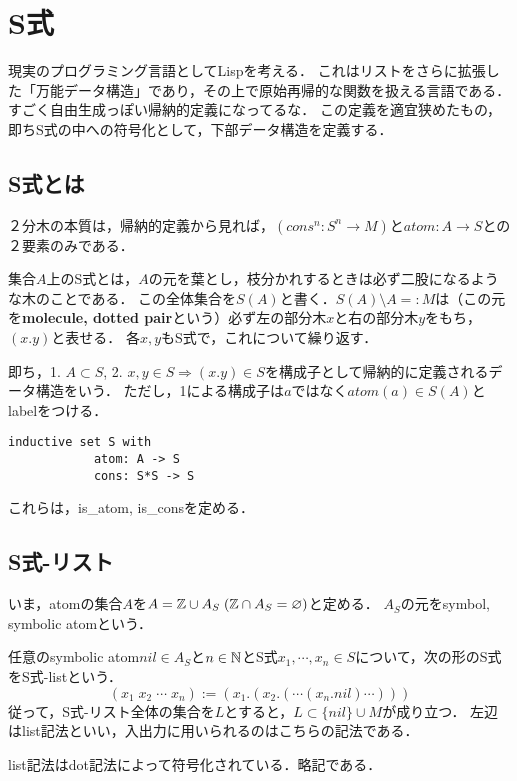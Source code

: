 \documentclass[uplatex, 12pt, dvipdfmx]{jsreport}
\begin{document}
\section{S式}

現実のプログラミング言語としてLispを考える．
これはリストをさらに拡張した「万能データ構造」であり，その上で原始再帰的な関数を扱える言語である．
すごく自由生成っぽい帰納的定義になってるな．
この定義を適宜狭めたもの，即ちS式の中への符号化として，下部データ構造を定義する．

\subsection{S式とは}

２分木の本質は，帰納的定義から見れば，$(cons^n:S^n\to M)$と$atom:A\to S$との２要素のみである．

\begin{definition}
    集合$A$上のS式とは，$A$の元を葉とし，枝分かれするときは必ず二股になるような木のことである．
    この全体集合を$S(A)$と書く．$S(A)\setminus A=:M$は（この元を\textbf{molecule, dotted pair}という）必ず左の部分木$x$と右の部分木$y$をもち，$(x.y)$と表せる．
    各$x,y$もS式で，これについて繰り返す．
\end{definition}
\begin{remark}
    即ち，1. $A\subset S$, 2. $x,y\in S\Rightarrow (x.y)\in S$を構成子として帰納的に定義されるデータ構造をいう．
    ただし，1による構成子は$a$ではなく$atom(a)\in S(A)$とlabelをつける．
    \begin{lstlisting}[caption=inductive definition of S-formula]
        inductive set S with
            atom: A -> S
            cons: S*S -> S
    \end{lstlisting}
    これらは，is\_atom, is\_consを定める．
\end{remark}

\subsection{S式-リスト}

\begin{definition}
    いま，atomの集合$A$を$A=\mathbb{Z}\cup A_S\;(\mathbb{Z}\cap A_S=\varnothing)$と定める．
    $A_S$の元をsymbol, symbolic atomという．
\end{definition}

\begin{definition}[list]
    任意のsymbolic atom$nil\in A_S$と$n\in\mathbb{N}$とS式$x_1,\cdots,x_n\in S$について，次の形のS式をS式-listという．
    \[ (x_1\;x_2\;\cdots\;x_n) := (x_1.(x_2.(\cdots(x_n.nil)\cdots))) \]
    従って，S式-リスト全体の集合を$L$とすると，$L\subset\{nil\}\cup M$が成り立つ．
    左辺はlist記法といい，入出力に用いられるのはこちらの記法である．
\end{definition}
\begin{remark}
    list記法はdot記法によって符号化されている．略記である．
\end{remark}
\end{document}
